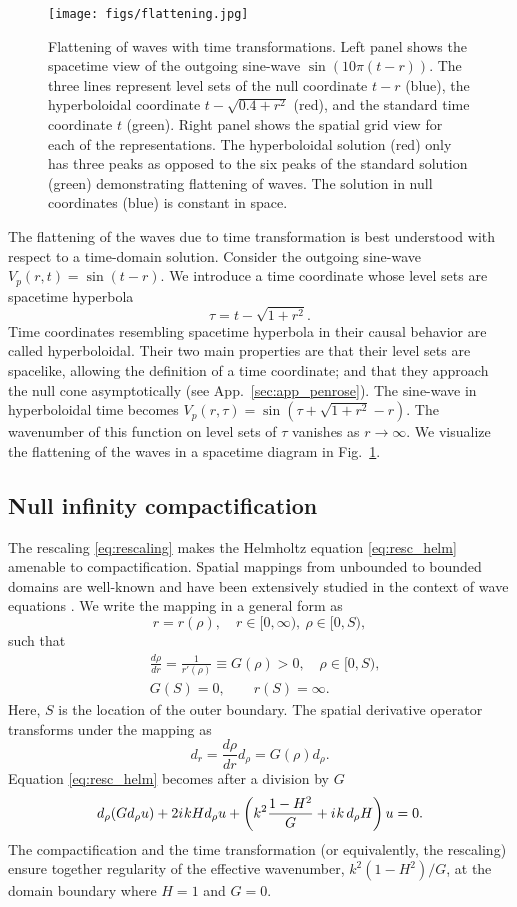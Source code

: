 \documentclass[draft,onefignum,onetabnum]{siamart190516}
\newcommand{\be}{\begin{equation}}
\newcommand{\ee}{\end{equation}}
\newcommand{\iu}{{i\mkern1mu}}
\begin{document}
\begin{figure}[h]
\centering
\texttt{[image: figs/flattening.jpg]}
\caption{Flattening of waves with time transformations. Left panel shows the spacetime view of the outgoing sine-wave $\sin(10\pi(t-r))$. The three lines represent level sets of the null coordinate $t-r$ (blue), the hyperboloidal coordinate $t-\sqrt{0.4+r^2}$ (red), and the standard time coordinate $t$ (green). Right panel shows the spatial grid view for each of the representations. The hyperboloidal solution (red) only has three peaks as opposed to the six peaks of the standard solution (green) demonstrating flattening of waves. The solution in null coordinates (blue) is constant in space.}
\label{fig:flattening}
\end{figure}

The flattening of the waves due to time transformation is best understood with respect to a time-domain solution. Consider the outgoing sine-wave $V_p(r,t) = \sin(t-r)$. We introduce a time coordinate whose level sets are spacetime hyperbola
\be\label{eq:hyperbola} \tau = t - \sqrt{1+r^2}.\ee
Time coordinates resembling spacetime hyperbola in their causal behavior are called hyperboloidal. Their two main properties are that their level sets are spacelike, allowing the definition of a time coordinate; and that they approach the null cone asymptotically (see App.~\ref{sec:app_penrose}). The sine-wave in hyperboloidal time becomes $V_p(r,\tau) = \sin\left(\tau + \sqrt{1+r^2} - r\right)$. The wavenumber of this function on level sets of $\tau$ vanishes as $r\to\infty$. We visualize the flattening of the waves in a spacetime diagram in Fig.~\ref{fig:flattening}.

\subsection{Null infinity compactification}\label{sec:nic}
The rescaling \eqref{eq:rescaling} makes the Helmholtz equation \eqref{eq:resc_helm} amenable to compactification. Spatial mappings from unbounded to bounded domains are well-known and have been extensively studied in the context of wave equations \cite{GroschOrszag77, boyd1982optimization, shen2009some, wang2017perfect}. We write the mapping in a general form as
\[ r = r(\rho), \quad r\in[0,\infty),\ \rho\in[0,S), \]
such that
\begin{align*}
	 & \frac{d\rho}{dr} = \frac{1}{r'(\rho)} \equiv G(\rho) > 0, \quad \rho\in [0,S), \\
	 & G(S)      = 0, \qquad r(S) = \infty.
\end{align*}
Here, $S$ is the location of the outer boundary. The spatial derivative operator transforms under the mapping as
\[ d_r = \frac{d\rho}{dr} d_\rho = G(\rho) d_\rho.  \]
Equation \eqref{eq:resc_helm} becomes after a division by $G$ 
\be\label{eq:trafo_helm}
d_\rho (G d_\rho u) + 2 \iu k H d_\rho u + \left(k^2 \frac{1-H^2}{G} + \iu k \, d_\rho H \right) u = 0.
\ee
The compactification and the time transformation (or equivalently, the rescaling) ensure together regularity of the effective wavenumber, $k^2 (1-H^2)/G$, at the domain boundary where $H=1$ and $G=0$. 
\end{document}
